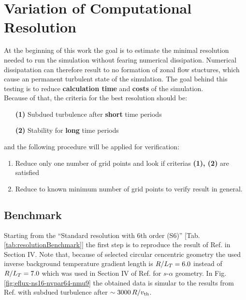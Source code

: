 \section{Variation of Computational Resolution}
\label{sec:variationsofresolution}

At the beginning of this work the goal is to estimate the minimal resolution needed to run the simulation without fearing numerical dissipation. Numerical dissipatation can therefore result to no formation of zonal flow stuctures, which cause an permanent turbulent state of the simulation. The goal behind this testing is to reduce \textbf{calculation time} and \textbf{costs} of the simulation. \\
Because of that, the criteria for the best resolution should be:
\begin{enumerate}
	\item[\textbf{(1)}] Subdued turbulence after \textbf{short} time periods
	\item[\textbf{(2)}] Stability for \textbf{long} time periods 
\end{enumerate}
and the following procedure will be applied for verification:
\begin{enumerate}
	\item Reduce only one number of grid points and look if criterias \textbf{(1), (2)} are satisfied
	\item Reduce to known minimum number of grid points to verify result in general.
\end{enumerate}

\subsection{Benchmark}
\label{sub:benchmark}

Starting from the \enquote{Standard resolution with 6th order (S6)} [Tab. \ref{tab:resolutionBenchmark}] the first step is to reproduce the result of Ref.  in Section IV. Note that, because of selected circular cencentric geometry the used inverse background temperature gradient length is $R/L_T = 6.0$ instead of $R/L_T = 7.0$ which was used in Section IV of Ref.  for $s$-$\alpha$ geometry. In Fig. \ref{fig:eflux-ns16-nvpar64-nmu9} the obtained data is simular to the results from Ref.  with subdued turbulence after $\sim 3000\,R/v_{\mathrm{th}}$. 


